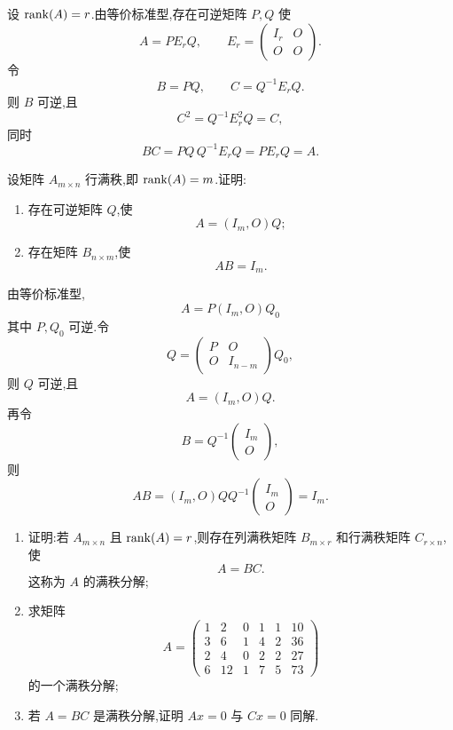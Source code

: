 \begin{solution}
设 $\operatorname{rank}(A)=r$.由等价标准型,存在可逆矩阵 $P,Q$ 使
\[
A=P E_r Q,
\qquad
E_r=\begin{pmatrix}I_r&O\\O&O\end{pmatrix}.
\]
令
\[
B=PQ,
\qquad
C=Q^{-1}E_rQ.
\]
则 $B$ 可逆,且
\[
C^2=Q^{-1}E_r^2Q=C,
\]
同时
\[
BC=PQ\,Q^{-1}E_rQ=PE_rQ=A.
\]
\end{solution}

\begin{example}[\markstar]
设矩阵 $A_{m\times n}$ 行满秩,即 $\operatorname{rank}(A)=m$.证明:
\begin{enumerate}
  \item 存在可逆矩阵 $Q$,使
  \[
  A=(I_m,O)Q;
  \]
  \item 存在矩阵 $B_{n\times m}$,使
  \[
  AB=I_m.
  \]
\end{enumerate}
\end{example}
\exampleblank

\begin{solution}
由等价标准型,
\[
A=P(I_m,O)Q_0
\]
其中 $P,Q_0$ 可逆.令
\[
Q=\begin{pmatrix}P&O\\O&I_{n-m}\end{pmatrix}Q_0,
\]
则 $Q$ 可逆,且
\[
A=(I_m,O)Q.
\]
再令
\[
B=Q^{-1}\begin{pmatrix}I_m\\O\end{pmatrix},
\]
则
\[
AB=(I_m,O)QQ^{-1}\begin{pmatrix}I_m\\O\end{pmatrix}=I_m.
\]
\end{solution}

\begin{example}[\markstar]
\begin{enumerate}
  \item 证明:若 $A_{m\times n}$ 且 $\operatorname{rank}(A)=r$,则存在列满秩矩阵 $B_{m\times r}$ 和行满秩矩阵 $C_{r\times n}$,使
  \[
  A=BC.
  \]
  这称为 $A$ 的满秩分解;
  \item 求矩阵
  \[
  A=
  \begin{pmatrix}
  1&2&0&1&1&10\\
  3&6&1&4&2&36\\
  2&4&0&2&2&27\\
  6&12&1&7&5&73
  \end{pmatrix}
  \]
  的一个满秩分解;
  \item 若 $A=BC$ 是满秩分解,证明 $Ax=0$ 与 $Cx=0$ 同解.
\end{enumerate}
\end{example}
\exampleblank

